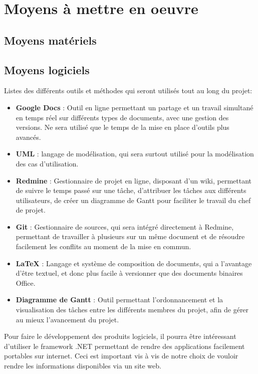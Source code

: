 \section{Moyens à mettre en oeuvre}

\subsection{Moyens matériels}
\subsection{Moyens logiciels}
Listes des différents outils et méthodes qui seront utilisés tout au long du projet:
\begin{itemize}
\item \textbf{Google Docs} : Outil en ligne permettant un partage et un travail simultané en temps réel sur différents types de documents, avec une gestion des versions. Ne sera utilisé que le temps de la mise en place d’outils plus avancés.
\item \textbf{UML} : langage de modélisation, qui sera surtout utilisé pour la modélisation des cas d’utilisation.
\item \textbf{Redmine} : Gestionnaire de projet en ligne, disposant d’un wiki, permettant de suivre le temps passé sur une tâche, d’attribuer les tâches aux différents utilisateurs, de créer un  diagramme de Gantt pour faciliter le travail du chef de projet.
\item \textbf{Git} : Gestionnaire de sources, qui sera intégré directement à Redmine, permettant de travailler à plusieurs sur un même document et de résoudre facilement les conflits au moment de la mise en commun.
\item \textbf{LaTeX} : Langage et système de composition de documents, qui a l’avantage d’être textuel, et donc plus facile à versionner que des documents binaires Office.
\item \textbf{Diagramme de Gantt } : Outil permettant l’ordonnancement et la visualisation des tâches entre les différents membres du projet, afin de gérer au mieux l’avancement du projet.
\end{itemize}
Pour faire le développement des produits logiciels, il pourra être intéressant d'utiliser le framework .NET permettant de rendre des applications facilement portables sur internet. Ceci est important vis à vis de notre choix de vouloir rendre les informations disponibles via un site web.

